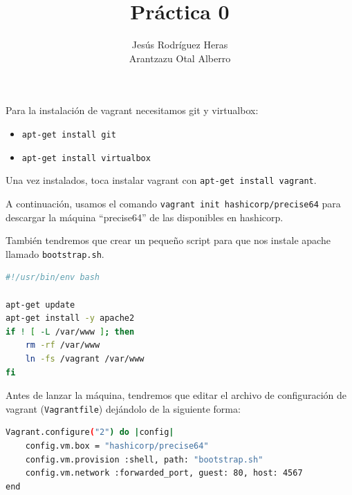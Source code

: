\documentclass[12pt,letterpaper]{article}
\title{Práctica 0}
\author{Jesús Rodríguez Heras\\
	Arantzazu Otal Alberro}
\begin{document}
	
	\maketitle
%			
	\thispagestyle{empty}
	\newpage
	
	
	
	
	
	\lstset{language=bash, numbers=left, numberstyle=\tiny, numbersep=10pt, firstnumber=1, stepnumber=1, basicstyle=\small\ttfamily, tabsize=1, extendedchars=true, inputencoding=utf8/latin1, breaklines=true}
	
Para la instalación de vagrant necesitamos git y virtualbox:
\begin{itemize}
	\item \texttt{apt-get install git}
	\item \texttt{apt-get install virtualbox}
\end{itemize}
Una vez instalados, toca instalar vagrant con \texttt{apt-get install vagrant}.

A continuación, usamos el comando \texttt{vagrant init hashicorp/precise64} para descargar la máquina ``precise64'' de las disponibles en hashicorp.

También tendremos que crear un pequeño script para que nos instale apache llamado \texttt{bootstrap.sh}.
\begin{lstlisting}[language=Bash]
#!/usr/bin/env bash

apt-get update
apt-get install -y apache2
if ! [ -L /var/www ]; then
    rm -rf /var/www
    ln -fs /vagrant /var/www
fi
\end{lstlisting}

Antes de lanzar la máquina, tendremos que editar el archivo de configuración de vagrant (\texttt{Vagrantfile}) dejándolo de la siguiente forma:
\begin{lstlisting}[language=Bash]
Vagrant.configure("2") do |config|
    config.vm.box = "hashicorp/precise64"
    config.vm.provision :shell, path: "bootstrap.sh"
    config.vm.network :forwarded_port, guest: 80, host: 4567
end
\end{lstlisting}
\end{document}
